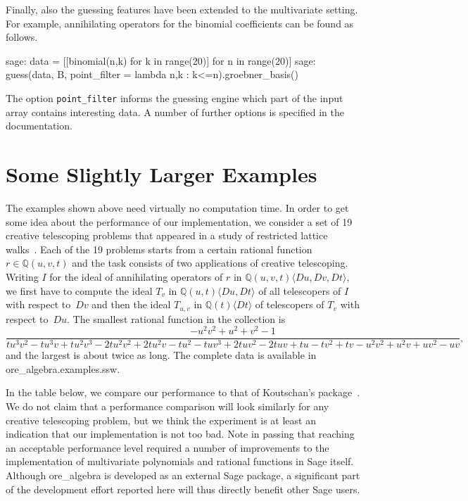 \documentclass[11pt]{article}
\def\<#1>{\langle#1\rangle}
\let\set\mathbb
\begin{document}
Finally, also the guessing features have been extended to the multivariate setting. For example, annihilating operators
for the binomial coefficients can be found as follows.
\begin{sageexample}
  sage: data = [[binomial(n,k) for k in range(20)] for n in range(20)]
  sage: guess(data, B, point_filter = lambda n,k : k<=n).groebner_basis()
\end{sageexample}
The option \verb|point_filter| informs the guessing engine which part of the input array contains interesting data.
A number of further options is specified in the documentation. 

\section{Some Slightly Larger Examples}

The examples shown above need virtually no computation time. In order to get some idea about the performance of our
implementation, we consider a set of 19 creative telescoping problems that appeared in a study of restricted lattice
walks~\cite{bostan16b}.
Each of the 19 problems starts from a certain rational function $r\in\set Q(u,v,t)$ and the task consists of two
applications of creative telescoping. Writing $I$ for the ideal of annihilating operators of $r$ in $\set Q(u,v,t)\<Du,Dv,Dt>$,
we first have to compute the ideal $T_v$ in $\set Q(u,t)\<Du,Dt>$ of all telescopers of $I$ with respect to~$Dv$ and then
the ideal $T_{u,v}$ in $\set Q(t)\<Dt>$ of telescopers of $T_v$ with respect to~$Du$. The smallest rational function in
the collection is
\[
\frac{{-}u^2 v^2{+}u^2{+}v^2{-}1}{t u^3 v^2{-}t u^3 v{+}t u^2 v^3{-}2 t u^2 v^2{+}2 t u^2 v{-}t u^2{-}t u v^3{+}2 t u v^2{-}2 t
  u v+t u-t v^2+t v-u^2 v^2+u^2 v+u v^2-u v},
\]
and the largest is about twice as long. The complete data is available in ore\_algebra.examples.ssw.

In the table below, we compare our performance to that of Koutschan's package~\cite{koutschan10c}. We do not claim that a
performance comparison will look similarly for any creative telescoping problem, but we think the experiment is at least
an indication that our implementation is not too bad.
Note in passing that reaching an acceptable performance level required a number of improvements to
the implementation of multivariate polynomials and rational functions in Sage itself.
Although ore\_algebra is developed as an external Sage package, a significant part of the
development effort reported here will thus directly benefit other Sage users.
\end{document}
